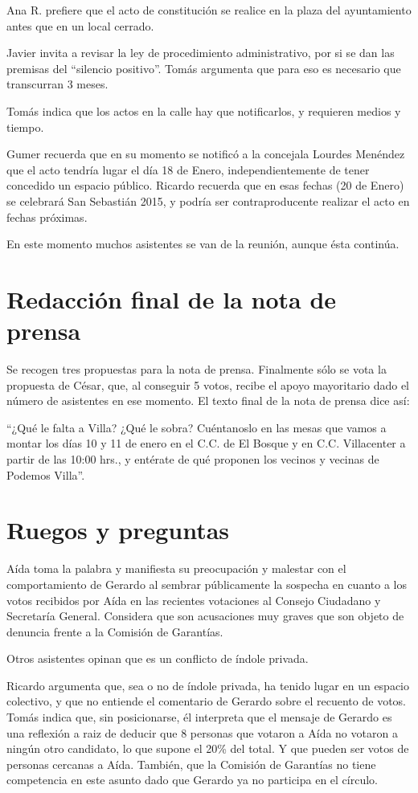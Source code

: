 \documentclass[11pt]{article}
\begin{document}
Ana R. prefiere que el acto de constitución se realice en la plaza del ayuntamiento antes que en un local cerrado. 

Javier invita a revisar la ley de procedimiento administrativo, por si se dan las premisas del ``silencio positivo''. Tomás argumenta que para eso es necesario que transcurran 3 meses.

Tomás indica que los actos en la calle hay que notificarlos, y requieren medios y tiempo.

Gumer recuerda que en su momento se notificó a la concejala Lourdes Menéndez que el acto tendría lugar el día 18 de Enero, independientemente de tener concedido un espacio público.
Ricardo recuerda que en esas fechas (20 de Enero) se celebrará San Sebastián 2015, y podría ser contraproducente realizar el acto en fechas próximas.

En este momento muchos asistentes se van de la reunión, aunque ésta continúa.

\section{Redacción final de la nota de prensa}
\label{sec-6}

Se recogen tres propuestas para la nota de prensa. Finalmente sólo se vota la propuesta de César, que, al conseguir 5 votos, recibe el apoyo mayoritario dado el número de asistentes en ese momento.
El texto final de la nota de prensa dice así:

``¿Qué le falta a Villa? ¿Qué le sobra? Cuéntanoslo en las mesas que vamos a montar los días 10 y 11 de enero en el C.C. de El Bosque y en C.C. Villacenter a partir de las 10:00 hrs., y entérate de qué proponen los vecinos y vecinas de Podemos Villa''.

\section{Ruegos y preguntas}
\label{sec-7}

Aída toma la palabra y manifiesta su preocupación y malestar con el comportamiento de Gerardo al sembrar públicamente la sospecha en cuanto a los votos recibidos por Aída en las recientes votaciones al Consejo Ciudadano y Secretaría General.
Considera que son acusaciones muy graves que son objeto de denuncia frente a la Comisión de Garantías.

Otros asistentes opinan que es un conflicto de índole privada.

Ricardo argumenta que, sea o no de índole privada, ha tenido lugar en un espacio colectivo, y que no entiende el comentario de Gerardo sobre el recuento de votos.
Tomás indica que, sin posicionarse, él interpreta que el mensaje de Gerardo es una reflexión a raiz de deducir que 8 personas que votaron a Aída no votaron a ningún otro candidato, lo que supone el 20\% del total. Y que pueden ser votos de personas cercanas a Aída.
También, que la Comisión de Garantías no tiene competencia en este asunto dado que Gerardo ya no participa en el círculo.
\end{document}
